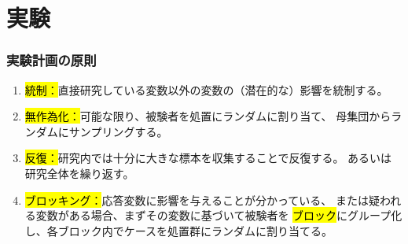
\section{実験}


\begin{frame}
\frametitle{実験計画の原則}

\begin{enumerate}

\item \hl{統制：}直接研究している変数以外の変数の（潜在的な）影響を統制する。

\item \hl{無作為化：}可能な限り、被験者を処置にランダムに割り当て、
母集団からランダムにサンプリングする。

\item \hl{反復：}研究内では十分に大きな標本を収集することで反復する。
あるいは研究全体を繰り返す。

\item \hl{ブロッキング：}応答変数に影響を与えることが分かっている、
または疑われる変数がある場合、まずその変数に基づいて被験者を
\hl{ブロック}にグループ化し、各ブロック内でケースを処置群にランダムに割り当てる。

\end{enumerate}

\end{frame}


